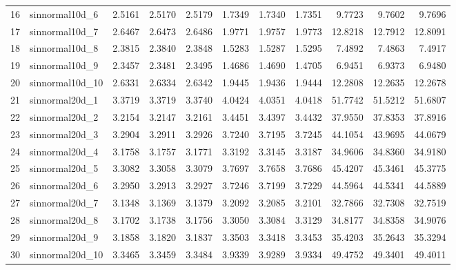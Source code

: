 \begin{table}[ht]
\begin{tabular}{rlrrrrrrrrr}
  16 & sinnormal10d\_6  & 2.5161 & 2.5170 & 2.5179 & 1.7349 & 1.7340 & 1.7351 & 9.7723 & 9.7602 & 9.7696 \\ 
  17 & sinnormal10d\_7  & 2.6467 & 2.6473 & 2.6486 & 1.9771 & 1.9757 & 1.9773 & 12.8218 & 12.7912 & 12.8091 \\ 
  18 & sinnormal10d\_8  & 2.3815 & 2.3840 & 2.3848 & 1.5283 & 1.5287 & 1.5295 & 7.4892 & 7.4863 & 7.4917 \\ 
  19 & sinnormal10d\_9  & 2.3457 & 2.3481 & 2.3495 & 1.4686 & 1.4690 & 1.4705 & 6.9451 & 6.9373 & 6.9480 \\ 
  20 & sinnormal10d\_10 & 2.6331 & 2.6334 & 2.6342 & 1.9445 & 1.9436 & 1.9444 & 12.2808 & 12.2635 & 12.2678 \\ 
  21 & sinnormal20d\_1  & 3.3719 & 3.3719 & 3.3740 & 4.0424 & 4.0351 & 4.0418 & 51.7742 & 51.5212 & 51.6807 \\ 
  22 & sinnormal20d\_2  & 3.2154 & 3.2147 & 3.2161 & 3.4451 & 3.4397 & 3.4432 & 37.9550 & 37.8353 & 37.8916 \\ 
  23 & sinnormal20d\_3  & 3.2904 & 3.2911 & 3.2926 & 3.7240 & 3.7195 & 3.7245 & 44.1054 & 43.9695 & 44.0679 \\ 
  24 & sinnormal20d\_4  & 3.1758 & 3.1757 & 3.1771 & 3.3192 & 3.3145 & 3.3187 & 34.9606 & 34.8360 & 34.9180 \\ 
  25 & sinnormal20d\_5  & 3.3082 & 3.3058 & 3.3079 & 3.7697 & 3.7658 & 3.7686 & 45.4207 & 45.3461 & 45.3775 \\ 
  26 & sinnormal20d\_6  & 3.2950 & 3.2913 & 3.2927 & 3.7246 & 3.7199 & 3.7229 & 44.5964 & 44.5341 & 44.5889 \\ 
  27 & sinnormal20d\_7  & 3.1348 & 3.1369 & 3.1379 & 3.2092 & 3.2085 & 3.2101 & 32.7866 & 32.7308 & 32.7519 \\ 
  28 & sinnormal20d\_8  & 3.1702 & 3.1738 & 3.1756 & 3.3050 & 3.3084 & 3.3129 & 34.8177 & 34.8358 & 34.9076 \\ 
  29 & sinnormal20d\_9  & 3.1858 & 3.1820 & 3.1837 & 3.3503 & 3.3418 & 3.3453 & 35.4203 & 35.2643 & 35.3294 \\ 
  30 & sinnormal20d\_10 & 3.3465 & 3.3459 & 3.3484 & 3.9339 & 3.9289 & 3.9334 & 49.4752 & 49.3401 & 49.4011 \\ 
   \hline
\end{tabular}
\end{table}
